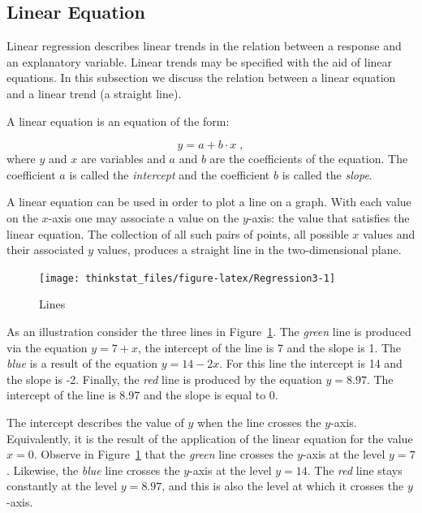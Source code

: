 \documentclass[]{krantz}
\theoremstyle{definition}
\theoremstyle{definition}
\theoremstyle{definition}
\theoremstyle{remark}
\begin{document}
\subsection{Linear Equation}\label{linear-equation}

Linear regression describes linear trends in the relation between a
response and an explanatory variable. Linear trends may be specified
with the aid of linear equations. In this subsection we discuss the
relation between a linear equation and a linear trend (a straight line).

A linear equation is an equation of the form:

\[y = a + b \cdot x\;,\] where \(y\) and \(x\) are variables and \(a\)
and \(b\) are the coefficients of the equation. The coefficient \(a\) is
called the \emph{intercept} and the coefficient \(b\) is called the
\emph{slope}.

A linear equation can be used in order to plot a line on a graph. With
each value on the \(x\)-axis one may associate a value on the
\(y\)-axis: the value that satisfies the linear equation. The collection
of all such pairs of points, all possible \(x\) values and their
associated \(y\) values, produces a straight line in the two-dimensional
plane.

\begin{figure}

{\centering \texttt{[image: thinkstat\_files/figure-latex/Regression3-1]} 

}

\caption{Lines}\label{fig:Regression3}
\end{figure}

As an illustration consider the three lines in
Figure~\ref{fig:Regression3}. The \emph{green} line is produced via the
equation \(y = 7 + x\), the intercept of the line is 7 and the slope is
1. The \emph{blue} is a result of the equation \(y = 14 - 2 x\). For
this line the intercept is 14 and the slope is -2. Finally, the
\emph{red} line is produced by the equation \(y = 8.97\). The intercept
of the line is 8.97 and the slope is equal to 0.

The intercept describes the value of \(y\) when the line crosses the
\(y\)-axis. Equivalently, it is the result of the application of the
linear equation for the value \(x=0\). Observe in
Figure~\ref{fig:Regression3} that the \emph{green} line crosses the
\(y\)-axis at the level \(y=7\). Likewise, the \emph{blue} line crosses
the \(y\)-axis at the level \(y=14\). The \emph{red} line stays
constantly at the level \(y=8.97\), and this is also the level at which
it crosses the \(y\)-axis.
\end{document}
